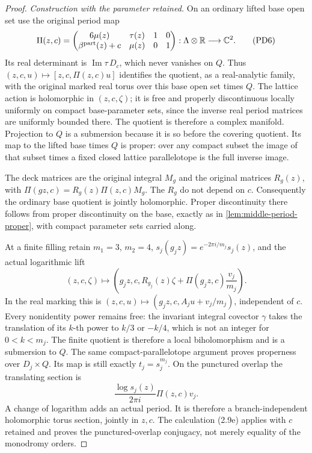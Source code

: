 \begin{proof}
\emph{Construction with the parameter retained.}
On an ordinary lifted base open set use the original period map
\[
 \Pi(z,c)=
 \begin{pmatrix}
 6\mu(z)&\tau(z)&1&0\\
 \beta^{\rm part}(z)+c&\mu(z)&0&1
 \end{pmatrix}:
 \Lambda\otimes\mathbb R\longrightarrow\mathbb C^2.
 \tag{PD6}
\]
Its real determinant is $\operatorname{Im}\tau\,D_c$, which never
vanishes on $Q$. Thus $(z,c,u)\mapsto[z,c,\Pi(z,c)u]$ identifies the
quotient, as a real-analytic family, with the original marked real torus
over this base open set times $Q$. The lattice action is holomorphic in
$(z,c,\zeta)$; it is free and properly discontinuous locally uniformly
on compact base-parameter sets, since the inverse real period matrices
are uniformly bounded there. The quotient is therefore a complex
manifold. Projection to $Q$ is a submersion because it is so before
the covering quotient. Its map to the lifted base times $Q$ is proper:
over any compact subset the image of that subset times a fixed closed
lattice parallelotope is the full inverse image.

The deck matrices are the original integral $M_g$ and the original
matrices $R_g(z)$, with
$\Pi(gz,c)=R_g(z)\Pi(z,c)M_g$. The $R_g$ do not depend on $c$.
Consequently the ordinary base quotient is jointly holomorphic.
Proper discontinuity there follows from proper discontinuity on the
base, exactly as in \cref{lem:middle-period-proper}, with compact
parameter sets carried along.

At a finite filling retain $m_1=3$, $m_2=4$,
$s_j(g_jz)=e^{-2\pi i/m_j}s_j(z)$, and the actual logarithmic lift
\[
 (z,c,\zeta)\longmapsto
 \left(g_jz,c,R_{g_j}(z)\zeta+
                  \Pi(g_jz,c)\frac{v_j}{m_j}\right).
 \tag{PD7}
\]
In the real marking this is $(z,c,u)\mapsto
(g_jz,c,A_ju+v_j/m_j)$, independent of $c$.
Every nonidentity power remains free: the invariant integral covector
$\gamma$ takes the translation of its $k$-th power to $k/3$ or $-k/4$,
which is not an integer for $0<k<m_j$.
The finite quotient is therefore a local biholomorphism and is a
submersion to $Q$. The same compact-parallelotope argument proves
properness over $D_j\times Q$. Its map is still exactly
$t_j=s_j^{m_j}$. On the punctured overlap the translating section is
\[
 \frac{\log s_j(z)}{2\pi i}\Pi(z,c)v_j.
 \tag{PD8}
\]
A change of logarithm adds an actual period. It is therefore a
branch-independent holomorphic torus section, jointly in $z,c$.
The calculation (2.9e) applies with $c$ retained and proves the
punctured-overlap conjugacy, not merely equality of the monodromy orders.


\end{proof}
